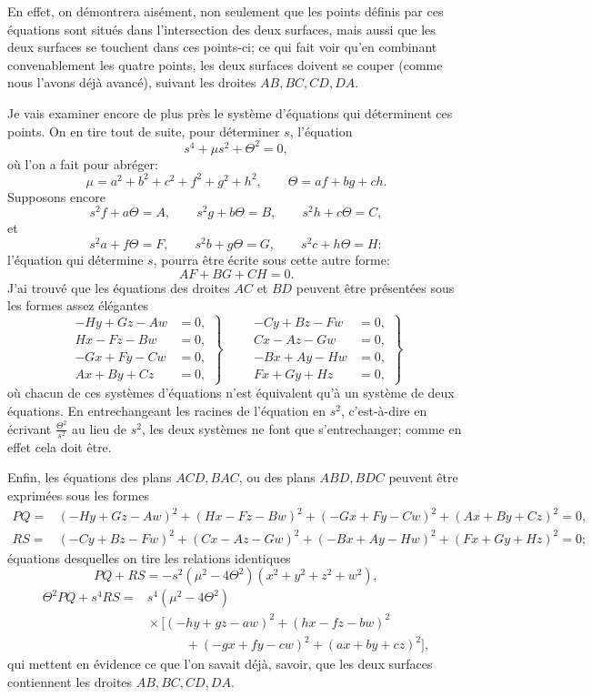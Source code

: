\documentclass[10pt]{article}
\newcommand{\qedpage}{\vfill\pagebreak}
\begin{document}
En effet, on d\'emontrera ais\'ement, non seulement que les points d\'efinis par ces
\'equations sont situ\'es dans l'intersection des deux surfaces, mais aussi que les
deux surfaces se touchent dans ces points-ci; ce qui fait voir qu'en combinant
convenablement les quatre points, les deux surfaces doivent se couper (comme nous
l'avons d\'ej\`a avanc\'e), suivant les droites $AB,BC,CD,DA$.

Je vais examiner encore de plus pr\`es le syst\`eme d'\'equations qui d\'eterminent ces
points. On en tire tout de suite, pour d\'eterminer $s$, l'\'equation
\[
s^4+\mu s^2+\Theta^2=0,
\]
o\`u l'on a fait pour abr\'eger:
\[
\mu=a^2+b^2+c^2+f^2+g^2+h^2,\qquad
\Theta=af+bg+ch.
\]
Supposons encore
\[
s^2f+a\Theta=A,\qquad s^2g+b\Theta=B,\qquad s^2h+c\Theta=C,
\]
et
\[
s^2a+f\Theta=F,\qquad s^2b+g\Theta=G,\qquad s^2c+h\Theta=H:
\]
l'\'equation qui d\'etermine $s$, pourra \^etre \'ecrite sous cette autre forme:
\[
AF+BG+CH=0.
\]
J'ai trouv\'e que les \'equations des droites $AC$ et $BD$ peuvent \^etre pr\'esent\'ees
sous les formes assez \'el\'egantes
\[
\left.
\begin{aligned}
-Hy+Gz-Aw&=0,\\
Hx-Fz-Bw&=0,\\
-Gx+Fy-Cw&=0,\\
Ax+By+Cz&=0,
\end{aligned}
\right\}
\qquad
\left.
\begin{aligned}
-Cy+Bz-Fw&=0,\\
Cx-Az-Gw&=0,\\
-Bx+Ay-Hw&=0,\\
Fx+Gy+Hz&=0,
\end{aligned}
\right\}
\]
o\`u chacun de ces syst\`emes d'\'equations n'est \'equivalent qu'\`a un syst\`eme de deux
\'equations. En entrechangeant les racines de l'\'equation en $s^2$, c'est-\`a-dire en
\'ecrivant $\frac{\Theta^2}{s^2}$ au lieu de $s^2$, les deux syst\`emes ne font que
s'entrechanger; comme en effet cela doit \^etre.

Enfin, les \'equations des plans $ACD,BAC$, ou des plans $ABD,BDC$ peuvent \^etre
exprim\'ees sous les formes
\[
\begin{aligned}
PQ={}&(-Hy+Gz-Aw)^2+(Hx-Fz-Bw)^2+(-Gx+Fy-Cw)^2+(Ax+By+Cz)^2=0,\\
RS={}&(-Cy+Bz-Fw)^2+(Cx-Az-Gw)^2+(-Bx+Ay-Hw)^2+(Fx+Gy+Hz)^2=0;
\end{aligned}
\]
\'equations desquelles on tire les relations identiques
\[
PQ+RS=-s^2(\mu^2-4\Theta^2)(x^2+y^2+z^2+w^2),
\]
\[
\begin{aligned}
\Theta^2PQ+s^4RS={}&s^4(\mu^2-4\Theta^2)\\
&{}\times\bigl[(-hy+gz-aw)^2+(hx-fz-bw)^2\\
&\qquad\quad+(-gx+fy-cw)^2+(ax+by+cz)^2\bigr],
\end{aligned}
\]
qui mettent en \'evidence ce que l'on savait d\'ej\`a, savoir, que les deux surfaces
contiennent les droites $AB,BC,CD,DA$.
\qedpage
\end{document}
